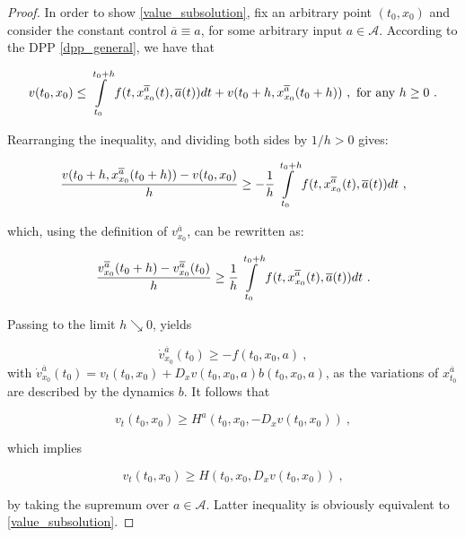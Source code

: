 \begin{theorem}
\begin{proof}
		In order to show \eqref{value_subsolution}, fix an arbitrary point $ (t_0, x_0) $ and consider the constant control $ \overline{a} \equiv a $, for some arbitrary input $ a \in \mathcal{A} $.
		According to the DPP \eqref{dpp_general}, we have that
		
		\begin{equation*}
			v(t_0, x_0) \leq \pathint{\overline{a}}{t_0}{t_0 + h} + v(t_0 + h,  x^{\overline{a}}_{x_0}(t_0 + h)) \ , \hbox{ for any } h \geq 0 \ .
		\end{equation*}
		
		Rearranging the inequality, and dividing both sides by $ 1 / h > 0 $ gives:
		
		\begin{equation}
			\label{diff_quotient_sub}
			\frac{v(t_0 + h, x^{\overline{a}}_{x_0}(t_0 + h)) - v(t_0, x_0)}{h} \geq - \frac{1}{h} \pathint{\overline{a}}{t_0}{t_0 + h} \ ,
		\end{equation}
		
		which, using the definition of $ v^{\overline{a}}_{x_0} $, can be rewritten as:
		
		\begin{equation*}
			\frac{v^{\overline{a}}_{x_0}(t_0 + h) - v^{\overline{a}}_{x_0}(t_0)}{h} \geq \frac{1}{h} \pathint{\overline{a}}{t_0}{t_0 + h} \ .
		\end{equation*}
		
		Passing to the limit $ h \searrow 0 $, yields
		
		\begin{equation*}
			\dot{v}^{\overline{a}}_{x_0}(t_0) \geq - f(t_0, x_0, a) \ ,
		\end{equation*}
		with $ \dot{v}^{\overline{a}}_{x_0}(t_0) = v_t(t_0, x_0) +  D_x v(t_0, x_0, a) b(t_0, x_0, a) $, as the variations of $ x^{\overline{a}}_{t_0} $ are described by the dynamics $ b $. It follows that
		
		\begin{equation*}
			v_t(t_0, x_0) \geq H^{a}(t_0, x_0, - D_x v(t_0, x_0)) \ ,
		\end{equation*}
		
		which implies
		
		\begin{equation*}
			v_t(t_0, x_0) \geq H(t_0, x_0, D_x v(t_0, x_0)) \ ,
		\end{equation*}
		
		by taking the supremum over $ a \in \mathcal{A} $. Latter inequality is obviously equivalent to \eqref{value_subsolution}.
		

\end{proof}
\end{theorem}
